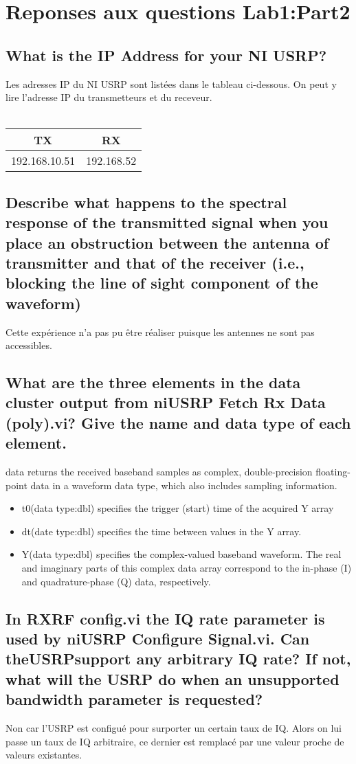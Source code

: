 \documentclass[11pt]{article}
\begin{document}
\section{Reponses aux questions Lab1:Part2}

\subsection{What is the IP Address for your NI USRP?}
Les adresses IP du NI USRP  sont listées dans le tableau ci-dessous. On peut y lire l'adresse IP du transmetteurs et du receveur. \\ \\
 \begin{tabular}{|c|c|}
      \hline
      TX & RX  \\
      \hline
      192.168.10.51 & 192.168.52 \\
      \hline
 \end{tabular}
\subsection{Describe what happens to the spectral response of the transmitted signal
when you place an obstruction between the antenna of transmitter and
that of the receiver (i.e., blocking the line of sight component of the
waveform)}
Cette expérience n'a pas pu être réaliser puisque les antennes ne sont pas accessibles. 
\subsection{What are the three elements in the data cluster output from niUSRP
Fetch Rx Data (poly).vi? Give the name and data type of each element.}
data returns the received baseband samples as complex, double-precision floating-point data in a waveform data type, which also includes sampling information.
\\
\begin{itemize}
 \item t0(data type:dbl) specifies the trigger (start) time of the acquired Y array
\item dt(date type:dbl) specifies the time between values in the Y array. 
\item Y(data type:dbl) specifies the complex-valued baseband waveform. The real and imaginary parts of this complex data           array correspond to the in-phase (I) and quadrature-phase (Q) data, respectively. 
\end{itemize}
\subsection{In RXRF config.vi the IQ rate parameter is used by niUSRP Configure
Signal.vi. Can theUSRPsupport any arbitrary IQ rate? If not, what will
the USRP do when an unsupported bandwidth parameter is requested?}

Non car l'USRP est configué pour surporter un certain taux de IQ. Alors on lui passe un taux de IQ arbitraire, ce dernier est remplacé par une valeur proche de valeurs existantes.
\end{document}
